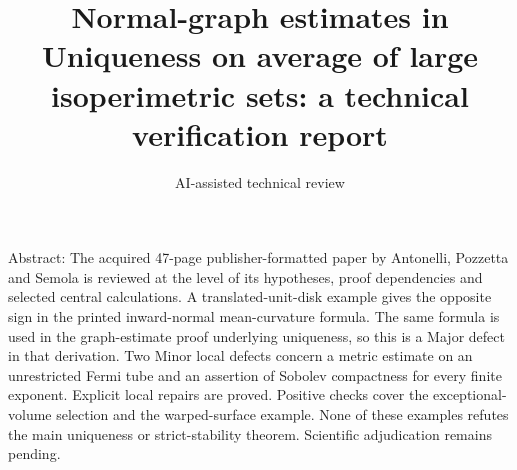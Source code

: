 \documentclass[10pt]{article}
\title{Normal-graph estimates in Uniqueness on average of large isoperimetric sets: a technical verification report}
\author{AI-assisted technical review}
\date{}
\begin{document}
\maketitle
Abstract: The acquired 47-page publisher-formatted paper by Antonelli, Pozzetta and Semola is reviewed at the level of its hypotheses, proof dependencies and selected central calculations. A translated-unit-disk example gives the opposite sign in the printed inward-normal mean-curvature formula. The same formula is used in the graph-estimate proof underlying uniqueness, so this is a Major defect in that derivation. Two Minor local defects concern a metric estimate on an unrestricted Fermi tube and an assertion of Sobolev compactness for every finite exponent. Explicit local repairs are proved. Positive checks cover the exceptional-volume selection and the warped-surface example. None of these examples refutes the main uniqueness or strict-stability theorem. Scientific adjudication remains pending.\par
\end{document}
